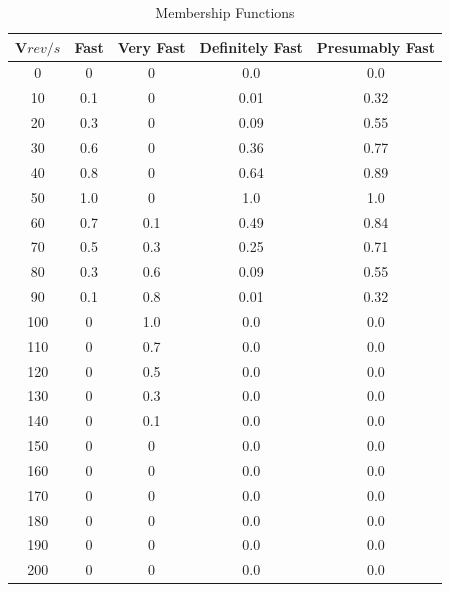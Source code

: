 \documentclass{tron}
\begin{document}
\begin{table}[H]
  \begin{center}
    \caption{Membership Functions}
    \label{table:p3:result}
		\begin{tabular}{ccccc}
		\hline
		V$\unit{rev/s}$ & Fast & Very Fast & Definitely Fast & Presumably Fast \\
		\hline
		\hline
		0    &   0    &   0   &   0.0   &   0.0   \\
		10   &   0.1  &   0   &   0.01  &   0.32  \\
		20   &   0.3  &   0   &   0.09  &   0.55  \\
		30   &   0.6  &   0   &   0.36  &   0.77  \\
		40   &   0.8  &   0   &   0.64  &   0.89  \\
		50   &   1.0  &   0   &   1.0   &   1.0   \\
		60   &   0.7  &   0.1 &   0.49  &   0.84  \\
		70   &   0.5  &   0.3 &   0.25  &   0.71  \\
		80   &   0.3  &   0.6 &   0.09  &   0.55  \\
		90   &   0.1  &   0.8 &   0.01  &   0.32  \\
		100  &   0    &   1.0 &   0.0   &   0.0   \\
		110  &   0    &   0.7 &   0.0   &   0.0   \\
		120  &   0    &   0.5 &   0.0   &   0.0   \\
		130  &   0    &   0.3 &   0.0   &   0.0   \\
		140  &   0    &   0.1 &   0.0   &   0.0   \\
		150  &   0    &   0   &   0.0   &   0.0   \\
		160  &   0    &   0   &   0.0   &   0.0   \\
		170  &   0    &   0   &   0.0   &   0.0   \\
		180  &   0    &   0   &   0.0   &   0.0   \\
		190  &   0    &   0   &   0.0   &   0.0   \\
		200  &   0    &   0   &   0.0   &   0.0   \\
		\hline
		\end{tabular}
  \end{center}
\end{table}


\clearpage
\end{document}
